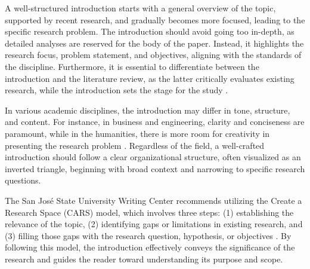 A well-structured introduction starts with a general overview of the topic, supported by recent research, and gradually becomes more focused, leading to the specific research problem. The introduction should avoid going too in-depth, as detailed analyses are reserved for the body of the paper. Instead, it highlights the research focus, problem statement, and objectives, aligning with the standards of the discipline. Furthermore, it is essential to differentiate between the introduction and the literature review, as the latter critically evaluates existing research, while the introduction sets the stage for the study \cite{SJSUWritingCenterIntroduction}.

In various academic disciplines, the introduction may differ in tone, structure, and content. For instance, in business and engineering, clarity and conciseness are paramount, while in the humanities, there is more room for creativity in presenting the research problem \cite{SJSUWritingCenterIntroduction}. Regardless of the field, a well-crafted introduction should follow a clear organizational structure, often visualized as an inverted triangle, beginning with broad context and narrowing to specific research questions. 

The San José State University Writing Center recommends utilizing the Create a Research Space (CARS) model, which involves three steps: (1) establishing the relevance of the topic, (2) identifying gaps or limitations in existing research, and (3) filling those gaps with the research question, hypothesis, or objectives \cite{SJSUWritingCenterIntroduction}. By following this model, the introduction effectively conveys the significance of the research and guides the reader toward understanding its purpose and scope.

